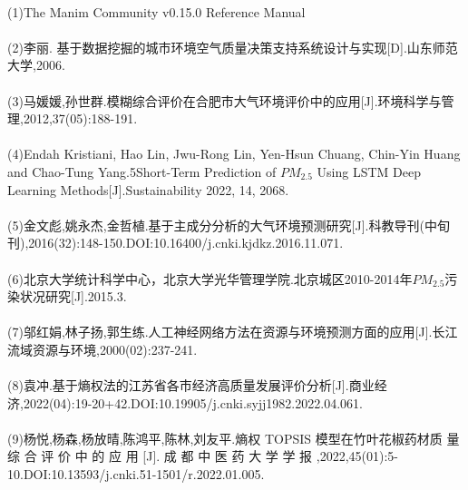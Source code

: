 \documentclass[preview]{standalone}
\begin{document}
\begin{center}
\quad\\(1)The Manim Community v0.15.0 Reference Manual\quad\\\quad\\(2)李丽. 基于数据挖掘的城市环境空气质量决策支持系统设计与实现[D].山东师范大学,2006.\quad\\\quad\\(3)马媛媛,孙世群.模糊综合评价在合肥市大气环境评价中的应用[J].环境科学与管理,2012,37(05):188-191.\quad\\\quad\\(4)Endah Kristiani, Hao Lin, Jwu-Rong Lin, Yen-Hsun Chuang, Chin-Yin Huang and Chao-Tung Yang.5Short-Term Prediction of $PM_{2.5}$ Using LSTM Deep Learning Methods[J].Sustainability 2022, 14, 2068.\quad\\\quad\\(5)金文彪,姚永杰,金哲植.基于主成分分析的大气环境预测研究[J].科教导刊(中旬刊),2016(32):148-150.DOI:10.16400/j.cnki.kjdkz.2016.11.071.\quad\\\quad\\(6)北京大学统计科学中心，北京大学光华管理学院.北京城区2010-2014年$PM_{2.5}$污染状况研究[J].2015.3.\quad\\\quad\\(7)邬红娟,林子扬,郭生练.人工神经网络方法在资源与环境预测方面的应用[J].长江流域资源与环境,2000(02):237-241.\quad\\\quad\\(8)袁冲.基于熵权法的江苏省各市经济高质量发展评价分析[J].商业经济,2022(04):19-20+42.DOI:10.19905/j.cnki.syjj1982.2022.04.061.\quad\\\quad\\(9)杨悦,杨森,杨放晴,陈鸿平,陈林,刘友平.熵权 TOPSIS 模型在竹叶花椒药材质 量 综 合 评 价 中 的 应 用 [J]. 成 都 中 医 药 大 学 学 报 ,2022,45(01):5-10.DOI:10.13593/j.cnki.51-1501/r.2022.01.005.\quad\\
\end{center}
\end{document}
